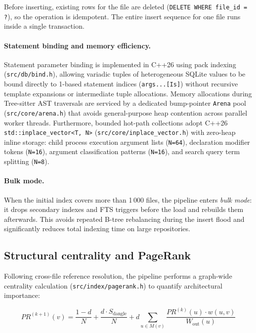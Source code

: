 Before inserting, existing rows for the file are deleted
(\texttt{DELETE WHERE file\_id = ?}), so the operation is idempotent. The
entire insert sequence for one file runs inside a single transaction.

\paragraph{Statement binding and memory efficiency.} Statement parameter binding
is implemented in C++26 using pack indexing (\texttt{src/db/bind.h}), allowing
variadic tuples of heterogeneous SQLite values to be bound directly to 1-based
statement indices (\texttt{args...[Is]}) without recursive template
expansions or intermediate tuple allocations. Memory allocations during
Tree-sitter AST traversals are serviced by a dedicated bump-pointer
\texttt{Arena} pool (\texttt{src/core/arena.h}) that avoids general-purpose
heap contention across parallel worker threads. Furthermore, bounded hot-path
collections adopt C++26 \texttt{std::inplace\_vector<T, N>}
(\texttt{src/core/inplace\_vector.h}) with zero-heap inline storage: child
process execution argument lists (\texttt{N=64}), declaration modifier tokens
(\texttt{N=16}), argument classification patterns (\texttt{N=16}), and search
query term splitting (\texttt{N=8}).

\paragraph{Bulk mode.} When the initial index covers more than 1\,000 files,
the pipeline enters \emph{bulk mode}: it drops secondary indexes and FTS
triggers before the load and rebuilds them afterwards. This avoids repeated
B-tree rebalancing during the insert flood and significantly reduces total
indexing time on large repositories.

\subsection{Structural centrality and PageRank}
\label{sec:pagerank}

Following cross-file reference resolution, the pipeline performs a graph-wide
centrality calculation (\texttt{src/index/pagerank.h}) to quantify architectural
importance:

\begin{equation}
  PR^{(k+1)}(v) = \frac{1 - d}{N} + \frac{d \cdot S_{\text{dangle}}}{N} + d \sum_{u \in M(v)} \frac{PR^{(k)}(u) \cdot w(u, v)}{W_{\text{out}}(u)}
\end{equation}

